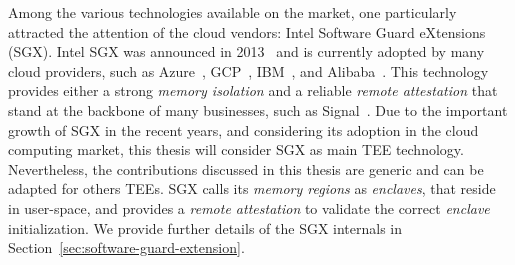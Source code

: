 Among the various technologies available on the market, one particularly 
attracted the attention of the cloud vendors: Intel Software Guard eXtensions 
(SGX).
Intel SGX was announced in 2013~\citep{rozas2013intel} and is currently 
adopted 
by many cloud providers, such as Azure~\citep{azure}, 
GCP~\citep{challita2018precise}, IBM~\citep{IBM}, and 
Alibaba~\citep{alibabasgx}.
This technology provides either a strong \emph{memory isolation} and a 
reliable 
\emph{remote attestation} that stand at the backbone of many businesses, such 
as Signal~\citep{signal}.
Due to the important growth of SGX in the recent years, and considering its 
adoption in the cloud computing market, this thesis will consider SGX as main 
TEE technology.
Nevertheless, the contributions discussed in this thesis are generic and can be 
adapted for others TEEs.
SGX calls its \emph{memory regions} as \emph{enclaves}, that reside in 
user-space, and provides a \emph{remote attestation} to validate the correct 
\emph{enclave} initialization.
We provide further details of the SGX internals in 
Section~\ref{sec:software-guard-extension}.


